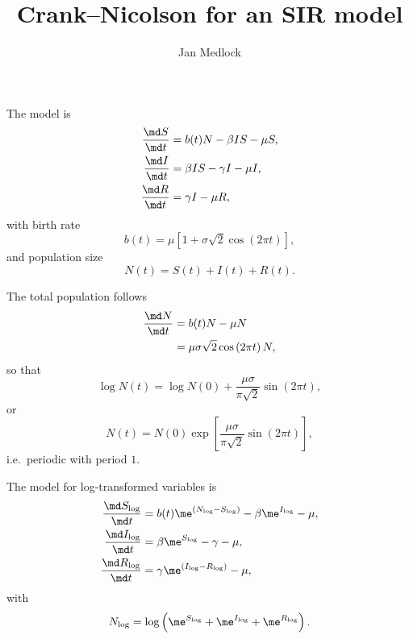 \documentclass{jpmarticle}
\title{Crank--Nicolson for an SIR model}
\author{Jan Medlock}
\begin{document}
\maketitle

The model is
\begin{equation}
  \begin{split}
    \frac{\md S}{\md t} &= b(t) N - \beta I S - \mu S,
    \\
    \frac{\md I}{\md t} &= \beta I S - \gamma I - \mu I,
    \\
    \frac{\md R}{\md t} &= \gamma I - \mu R,
  \end{split}
\end{equation}
with birth rate
\begin{equation}
  b(t) = \mu \left[
    1 + \sigma \sqrt{2} \cos\left(2 \pi t\right)
  \right],
\end{equation}
and population size
\begin{equation}
  N(t) = S(t) + I(t) + R(t).
\end{equation}

The total population follows
\begin{equation}
  \begin{split}
    \frac{\md N}{\md t}
    &= b(t) N - \mu N
    \\
    &= \mu \sigma \sqrt{2} \cos\left(2 \pi t\right) N,
  \end{split}
\end{equation}
so that
\begin{equation}
  \log N(t) = \log N(0)
  + \frac{\mu \sigma}{\pi \sqrt{2}}
  \sin\left(2 \pi t\right),
\end{equation}
or
\begin{equation}
  N(t) = N(0) \exp\left[
    \frac{\mu \sigma}{\pi \sqrt{2}}
    \sin\left(2 \pi t\right)
  \right],
\end{equation}
i.e.~periodic with period $1$.

The model for log-transformed variables is
\begin{equation}
  \begin{split}
    \frac{\md S_{\log}}{\md t}
    &= b(t) \me^{\left(N_{\log} - S_{\log}\right)}
    - \beta \me^{I_{\log}}
    - \mu,
    \\
    \frac{\md I_{\log}}{\md t}
    &= \beta \me^{S_{\log}} - \gamma - \mu,
    \\
    \frac{\md R_{\log}}{\md t}
    &= \gamma \me^{\left(I_{\log} - R_{\log}\right)}
    - \mu,
  \end{split}
\end{equation}
with
\begin{equation}
  N_{\log} = \log\left(
    \me^{S_{\log}} + \me^{I_{\log}} + \me^{R_{\log}}
  \right).
\end{equation}
\end{document}
